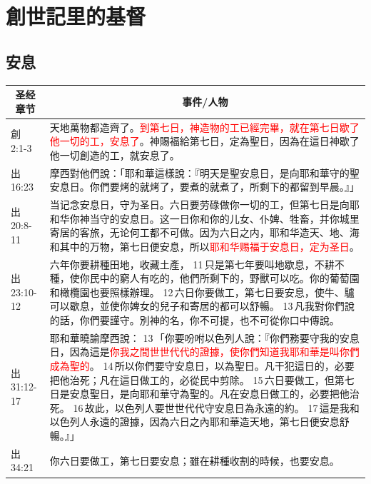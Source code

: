 \section{創世記里的基督}

\subsection{安息}
\begin{table}[H]
\centering
\begin{tabular}{p{2cm}|p{14.5cm}}\hline\hline
\multicolumn{1}{c|}{圣经章节}&\multicolumn{1}{c}{事件/人物}\\\hline
創 2:1-3&天地萬物都造齊了。\textcolor{red}{到第七日，神造物的工已經完畢，就在第七日歇了他一切的工，安息了}。神賜福給第七日，定為聖日，因為在這日神歇了他一切創造的工，就安息了。\\\hline

出16:23&
摩西對他們說：「耶和華這樣說：『明天是聖安息日，是向耶和華守的聖安息日。你們要烤的就烤了，要煮的就煮了，所剩下的都留到早晨。』」\\\hline

出 20:8-11&当记念安息日，守为圣日。六日要劳碌做你一切的工，但第七日是向耶和华你神当守的安息日。这一日你和你的儿女、仆婢、牲畜，并你城里寄居的客旅，无论何工都不可做。因为六日之内，耶和华造天、地、海和其中的万物，第七日便安息，所以\textcolor{red}{耶和华赐福于安息日，定为圣日}。\\\hline

出 23:10-12&六年你要耕種田地，收藏土產， 11 只是第七年要叫地歇息，不耕不種，使你民中的窮人有吃的，他們所剩下的，野獸可以吃。你的葡萄園和橄欖園也要照樣辦理。 12 六日你要做工，第七日要安息，使牛、驢可以歇息，並使你婢女的兒子和寄居的都可以舒暢。 13 凡我對你們說的話，你們要謹守。別神的名，你不可提，也不可從你口中傳說。\\\hline

出 31:12-17&耶和華曉諭摩西說： 13 「你要吩咐以色列人說：『你們務要守我的安息日，因為這是\textcolor{red}{你我之間世世代代的證據，使你們知道我耶和華是叫你們成為聖的}。 14 所以你們要守安息日，以為聖日。凡干犯這日的，必要把他治死；凡在這日做工的，必從民中剪除。 15 六日要做工，但第七日是安息聖日，是向耶和華守為聖的。凡在安息日做工的，必要把他治死。 16 故此，以色列人要世世代代守安息日為永遠的約。 17 這是我和以色列人永遠的證據，因為六日之內耶和華造天地，第七日便安息舒暢。』」\\\hline
出 34:21&你六日要做工，第七日要安息；雖在耕種收割的時候，也要安息。\\\hline


\end{tabular}
\end{table}
